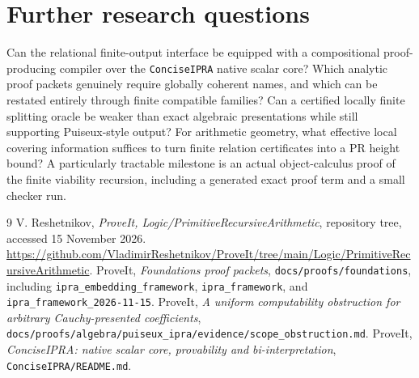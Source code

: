 \documentclass[11pt]{article}
\begin{document}
\section{Further research questions}
Can the relational finite-output interface be equipped with a compositional proof-producing compiler over the \texttt{ConciseIPRA} native scalar core? Which analytic proof packets genuinely require globally coherent names, and which can be restated entirely through finite compatible families? Can a certified locally finite splitting oracle be weaker than exact algebraic presentations while still supporting Puiseux-style output? For arithmetic geometry, what effective local covering information suffices to turn finite relation certificates into a PR height bound? A particularly tractable milestone is an actual object-calculus proof of the finite viability recursion, including a generated exact proof term and a small checker run.

\begin{thebibliography}{9}
 V. Reshetnikov, \emph{ProveIt, Logic/PrimitiveRecursiveArithmetic}, repository tree, accessed 15 November 2026. \url{https://github.com/VladimirReshetnikov/ProveIt/tree/main/Logic/PrimitiveRecursiveArithmetic}.
 ProveIt, \emph{Foundations proof packets}, \texttt{docs/proofs/foundations}, including \texttt{ipra\_embedding\_framework}, \texttt{ipra\_framework}, and \texttt{ipra\_framework\_2026-11-15}.
 ProveIt, \emph{A uniform computability obstruction for arbitrary Cauchy-presented coefficients}, \texttt{docs/proofs/algebra/puiseux\_ipra/evidence/scope\_obstruction.md}.
 ProveIt, \emph{ConciseIPRA: native scalar core, provability and bi-interpretation}, \texttt{ConciseIPRA/README.md}.
\end{thebibliography}
\end{document}
